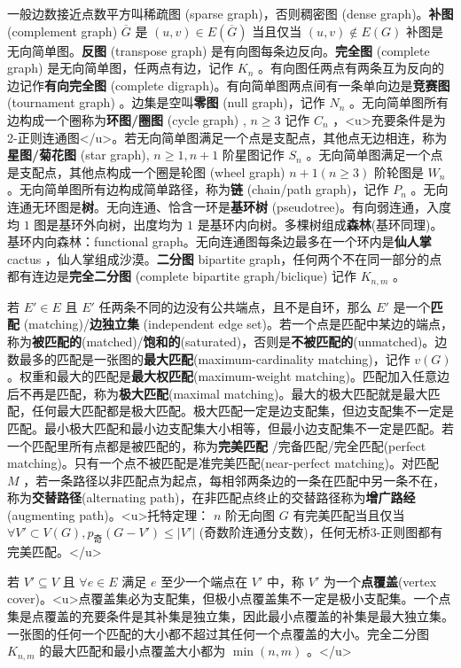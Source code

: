 \documentclass[twocolumn,10pt]{ctexart}
\begin{document}
一般边数接近点数平方叫稀疏图 (sparse graph)，否则稠密图 (dense graph)。\textbf{补图} (complement graph) $\overline G$ 是 $(u,v)\in E(\overline G)$ 当且仅当 $(u,v)\notin E(G)$ 补图是无向简单图。\textbf{反图} (transpose graph) 是有向图每条边反向。\textbf{完全图} (complete graph) 是无向简单图，任两点有边，记作 $K_n$ 。有向图任两点有两条互为反向的边记作\textbf{有向完全图} (complete digraph)。有向简单图两点间有一条单向边是\textbf{竞赛图} (tournament graph) 。边集是空叫\textbf{零图} (null graph)，记作 $N_n$ 。无向简单图所有边构成一个圈称为\textbf{环图/圈图} (cycle graph) , $n\ge 3$ 记作 $C_n$ ，<u>充要条件是为 2-正则连通图</u>。若无向简单图满足一个点是支配点，其他点无边相连，称为\textbf{星图/菊花图} (star graph), $n\ge1,n+1$ 阶星图记作 $S_n$ 。无向简单图满足一个点是支配点，其他点构成一个圈是轮图 (wheel graph) $n+1(n\ge 3)$ 阶轮图是 $W_n$ 。无向简单图所有边构成简单路径，称为\textbf{链} (chain/path graph)，记作 $P_n$ 。无向连通无环图是\textbf{树}。无向连通、恰含一环是\textbf{基环树} (pseudotree)。有向弱连通，入度均 $1$ 图是基环外向树，出度均为 $1$ 是基环内向树。多棵树组成\textbf{森林}(基环同理)。基环内向森林：functional graph。无向连通图每条边最多在一个环内是\textbf{仙人掌} cactus ，仙人掌组成沙漠。\textbf{二分图} bipartite graph，任何两个不在同一部分的点都有连边是\textbf{完全二分图} (complete bipartite graph/biclique) 记作 $K_{n,m}$ 。

若 $E'\in E$ 且 $E'$ 任两条不同的边没有公共端点，且不是自环，那么 $E'$  是一个\textbf{匹配} (matching)/\textbf{边独立集} (independent edge set)。若一个点是匹配中某边的端点，称为\textbf{被匹配的}(matched)/\textbf{饱和的}(saturated)，否则是\textbf{不被匹配的}(unmatched)。边数最多的匹配是一张图的\textbf{最大匹配}(maximum-cardinality matching)，记作 $v(G)$ 。权重和最大的匹配是\textbf{最大权匹配}(maximum-weight matching)。匹配加入任意边后不再是匹配，称为\textbf{极大匹配}(maximal matching)。最大的极大匹配就是最大匹配，任何最大匹配都是极大匹配。极大匹配一定是边支配集，但边支配集不一定是匹配。最小极大匹配和最小边支配集大小相等，但最小边支配集不一定是匹配。若一个匹配里所有点都是被匹配的，称为\textbf{完美匹配} /完备匹配/完全匹配(perfect matching)。只有一个点不被匹配是准完美匹配(near-perfect matching)。对匹配 $M$ ，若一条路径以非匹配点为起点，每相邻两条边的一条在匹配中另一条不在，称为\textbf{交替路径}(alternating path)，在非匹配点终止的交替路径称为\textbf{增广路经}(augmenting path)。<u>托特定理： $n$ 阶无向图 $G$ 有完美匹配当且仅当 $\forall V'\subset V(G),\allowbreak{}p_\text{奇}(G-V')\le |V'|$  (奇数阶连通分支数)，任何无桥3-正则图都有完美匹配。</u>

若 $V'\subseteq V$ 且 $\forall e\in E$ 满足 $e$ 至少一个端点在 $V'$ 中，称 $V'$ 为一个\textbf{点覆盖}(vertex cover)。<u>点覆盖集必为支配集，但极小点覆盖集不一定是极小支配集。一个点集是点覆盖的充要条件是其补集是独立集，因此最小点覆盖的补集是最大独立集。一张图的任何一个匹配的大小都不超过其任何一个点覆盖的大小。完全二分图 $K_{n,m}$ 的最大匹配和最小点覆盖大小都为 $\min(n,m)$ 。</u>
\end{document}
